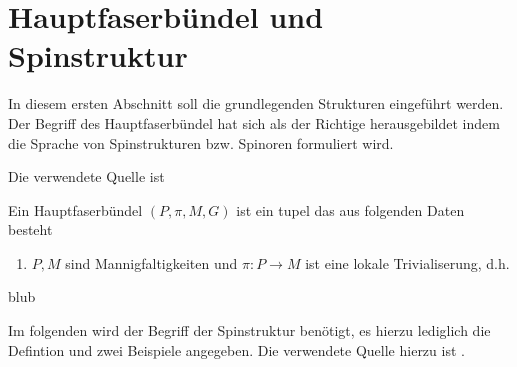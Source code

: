 






%
\section{Hauptfaserbündel und Spinstruktur}

In diesem ersten Abschnitt soll die grundlegenden Strukturen eingeführt 
werden. Der Begriff des Hauptfaserbündel hat sich als der Richtige
herausgebildet indem die Sprache von Spinstrukturen bzw. Spinoren
formuliert wird.

Die verwendete Quelle ist \cite{baum09}

\begin{Def}[Hauptfaserbündel]
	Ein \textsf{Hauptfaserbündel} $(P,\pi,M,G)$ ist ein tupel das
	aus folgenden Daten besteht
	\begin{enumerate}
		\item $P,M$ sind Mannigfaltigkeiten und $\pi : P \rightarrow M$ ist eine lokale Trivialiserung, d.h. 
	\end{enumerate}		
\end{Def}

\begin{Bsp}
	blub%
\end{Bsp}


Im folgenden wird der Begriff der Spinstruktur benötigt, es 
hierzu lediglich die Defintion und zwei Beispiele angegeben.
Die verwendete Quelle hierzu ist \cite{BHMMM15}.

